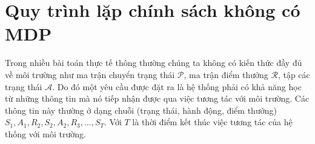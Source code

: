 \section{Quy trình lặp chính sách không có MDP}
Trong nhiều bài toán thực tế thông thường chúng ta không có kiến thức đầy đủ về môi trường như ma trận chuyển trạng thái $\mathcal{P}$, ma trận điểm thưởng $\mathcal{R}$, tập các trạng thái $\mathcal{A}$. Do đó một yêu cầu được đặt ra là hệ thống phải có khả năng học từ những thông tin mà nó tiếp nhận được qua việc tương tác với môi trường. Các thông tin này thường ở dạng chuỗi (trạng thái, hành động, điểm thưởng)
$\mathit{S}_1, \mathit{A}_1, \mathit{R}_2, \mathit{S}_2, \mathit{A}_2, \mathit{R}_3, \dots, \mathit{S}_T$. Với $T$ là thời điểm kết thúc việc tương tác của hệ thống với môi trường.

